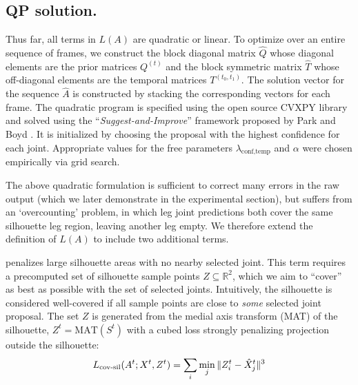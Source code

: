 \subsection{QP solution.}
Thus far, all terms in $L(A)$ are quadratic or linear.
To optimize over an entire sequence of frames, we construct the block diagonal matrix $\hat{Q}$ whose diagonal elements are the prior matrices $Q^{(t)}$ and the block symmetric matrix $\hat{T}$ whose off-diagonal elements are the temporal matrices $T^{(t_0, t_1)}$. The solution vector for the sequence $\hat{A}$ is constructed by stacking the corresponding vectors for each frame. The quadratic program is specified using the open source CVXPY library \cite{diamond2016cvxpy} and solved using the ``\emph{Suggest-and-Improve}'' framework proposed by Park and Boyd \cite{park2017general}. It is initialized by choosing the proposal with the highest confidence for each joint. Appropriate values for the free parameters $\lambda_{\text{conf}, \text{temp}}$ and $\alpha$ were chosen empirically via grid search. 

The above quadratic formulation is sufficient to correct many errors in the raw output (which we later demonstrate in the experimental section), but suffers from an `overcounting' problem, in which leg joint predictions both cover the same silhouette leg region, leaving another leg empty. We therefore extend the definition of $L(A)$ to include two additional terms. 

\def\silhouette{S}

 penalizes large silhouette areas with no nearby selected joint. This term requires a precomputed set of silhouette sample points $Z \subseteq \mathbb{R}^2$, which we aim to ``cover'' as best as possible with the set of selected joints. Intuitively, the silhouette is considered well-covered if all sample points are close to \emph{some} selected joint proposal. The set $Z$ is generated from the medial axis transform (MAT)\cite{blum1967transformation} of the silhouette, $Z^{t} = \text{MAT}(\silhouette^{t})$
with a cubed loss strongly penalizing projection outside the silhouette:
\begin{equation}
L_{\text{cov-sil}}(A^{t};X^{t},Z^{t}) = \sum_{i}\min_{j}\|Z_{i}^{t} - \hat{X}_{j}^{t}\|^3
\end{equation}

